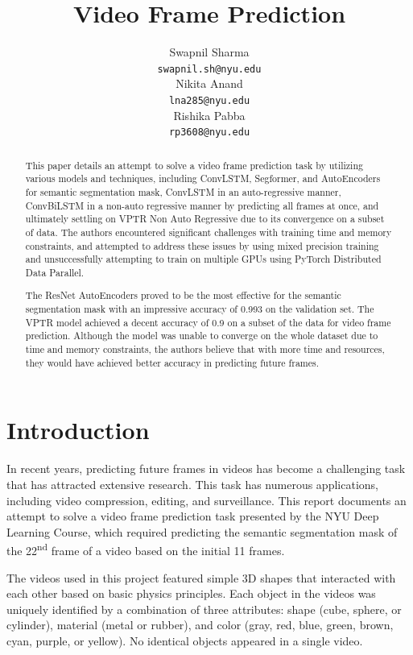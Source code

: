 \documentclass{article}
\title{Video Frame Prediction}
\author{%
  Swapnil Sharma \\
  \texttt{swapnil.sh@nyu.edu} \\
  \And
  Nikita Anand \\
  \texttt{lna285@nyu.edu} \\
  \And
  Rishika Pabba \\
  \texttt{rp3608@nyu.edu} \\
}
\begin{document}
\maketitle


\begin{abstract}
  This paper details an attempt to solve a video frame prediction task by utilizing various 
models and techniques, including ConvLSTM, Segformer, and AutoEncoders for semantic segmentation 
mask, ConvLSTM in an auto-regressive manner, ConvBiLSTM in a non-auto regressive manner by 
predicting all frames at once, and ultimately settling on VPTR Non Auto Regressive due to its 
convergence on a subset of data. The authors encountered significant challenges with training 
time and memory constraints, and attempted to address these issues by using mixed precision 
training and unsuccessfully attempting to train on multiple GPUs using PyTorch Distributed Data 
Parallel.

The ResNet AutoEncoders proved to be the most effective for the semantic segmentation mask with 
an impressive accuracy of 0.993 on the validation set. The VPTR model achieved a decent accuracy 
of 0.9 on a subset of the data for video frame prediction. Although the model was unable to 
converge on the whole dataset due to time and memory constraints, the authors believe that with 
more time and resources, they would have achieved better accuracy in predicting future frames.
\end{abstract}

\section{Introduction}
In recent years, predicting future frames in videos has become a challenging task that has 
attracted extensive research. This task has numerous applications, including video compression, 
editing, and surveillance. This report documents an attempt to solve a video frame prediction 
task presented by the NYU Deep Learning Course, which required predicting the semantic 
segmentation mask of the 22\textsuperscript{nd} frame of a video based on the initial 11 
frames.

The videos used in this project featured simple 3D shapes that interacted with each other 
based on basic physics principles. Each object in the videos was uniquely identified by a 
combination of three attributes: shape (cube, sphere, or cylinder), material (metal or rubber), 
and color (gray, red, blue, green, brown, cyan, purple, or yellow). No identical objects 
appeared in a single video.
\end{document}

